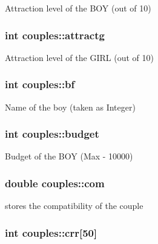 Attraction level of the B\-O\-Y (out of 10) 

\hypertarget{classcouples_a126d94fab4897bba6f93bf2fddaba430}{
\subsubsection[{attractg}]{\setlength{\rightskip}{0pt plus 5cm}int couples\-::attractg}}\label{classcouples_a126d94fab4897bba6f93bf2fddaba430}


Attraction level of the G\-I\-R\-L (out of 10) 

\hypertarget{classcouples_a45f3a15dcd4ab9cf580cf4915f4b72f1}{
\subsubsection[{bf}]{\setlength{\rightskip}{0pt plus 5cm}int couples\-::bf}}\label{classcouples_a45f3a15dcd4ab9cf580cf4915f4b72f1}


Name of the boy (taken as Integer) 

\hypertarget{classcouples_a0f8c151a59679e664969db57426ac1c6}{
\subsubsection[{budget}]{\setlength{\rightskip}{0pt plus 5cm}int couples\-::budget}}\label{classcouples_a0f8c151a59679e664969db57426ac1c6}


Budget of the B\-O\-Y (Max -\/ 10000) 

\hypertarget{classcouples_a52451c138cfb3ccb76dece86a80478f7}{
\subsubsection[{com}]{\setlength{\rightskip}{0pt plus 5cm}double couples\-::com}}\label{classcouples_a52451c138cfb3ccb76dece86a80478f7}


stores the compatibility of the couple 

\hypertarget{classcouples_a5519610d90930203210489914957d19e}{
\subsubsection[{crr}]{\setlength{\rightskip}{0pt plus 5cm}int couples\-::crr\mbox{[}50\mbox{]}}}\label{classcouples_a5519610d90930203210489914957d19e}


